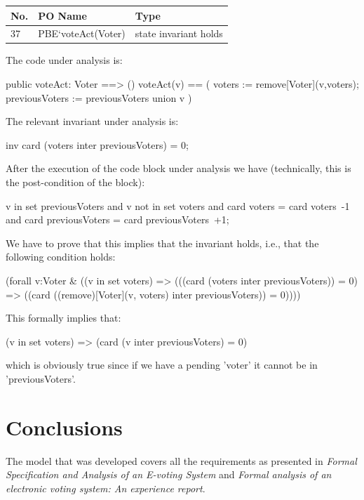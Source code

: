 \documentclass{article}
\begin{document}
\begin{center}
    \begin{tabular}{ | l | l | p{7cm} |}
    \hline
   \textbf{No.}	& \textbf{PO Name} & \textbf{Type} \\ \hline
	37 & PBE`voteAct(Voter) & state invariant holds\\\hline
    \end{tabular}
\end{center}

The code under analysis is:

\begin{vdmpp}
public voteAct: Voter ==> ()
voteAct(v) == (
			voters := remove[Voter](v,voters);
		    previousVoters := previousVoters union {v}
			)
\end{vdmpp}

The relevant invariant under analysis is:

\begin{vdmpp}
inv card (voters inter previousVoters) = 0;
\end{vdmpp}


After the execution of the code block under analysis we have (technically, this is the post-condition of the block):

\begin{vdmpp}
v in set previousVoters
and v not in set voters
and card voters = card voters~-1
and card previousVoters = card previousVoters~+1;
\end{vdmpp}

We have to prove that this implies that the invariant holds, i.e., that the following condition holds:

\begin{vdmpp}
(forall v:Voter & ((v in set voters) => 
(((card (voters inter previousVoters)) = 0) => 
((card ((remove)[Voter](v, voters) inter previousVoters)) = 0))))
\end{vdmpp}

This formally implies that:

\begin{vdmpp}
(v in set voters) => (card ({v} inter previousVoters) = 0) 
\end{vdmpp}

which is obviously true since if we have a pending 'voter' it cannot be in 'previousVoters'.

\section{Conclusions}
The model that was developed covers all the requirements as presented in \textit{Formal Specification and Analysis of an E-voting System}\cite{intro} and \textit{Formal analysis of an electronic voting system: An experience report}\cite{intro2}.
\end{document}
